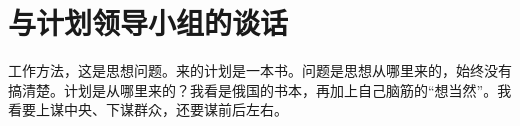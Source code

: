\section[与计划领导小组的谈话（一九六四年九月十二日）]{与计划领导小组的谈话}


工作方法，这是思想问题。来的计划是一本书。问题是思想从哪里来的，始终没有搞清楚。计划是从哪里来的？我看是俄国的书本，再加上自己脑筋的“想当然”。我看要上谋中央、下谋群众，还要谋前后左右。

